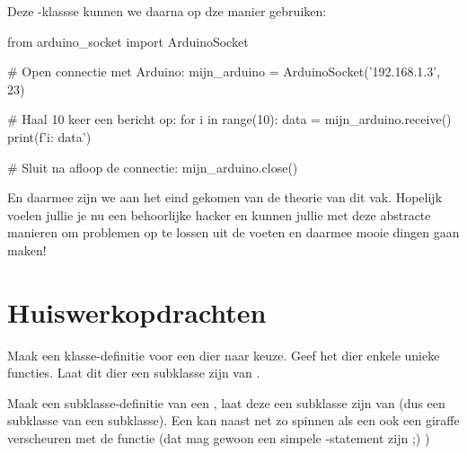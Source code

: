 Deze -klassse kunnen we daarna op dze manier gebruiken:
\begin{python}
from arduino_socket import ArduinoSocket

# Open connectie met Arduino:
mijn_arduino = ArduinoSocket('192.168.1.3', 23)

# Haal 10 keer een bericht op:
for i in range(10):
    data = mijn_arduino.receive()
    print(f'{i}: {data}')

# Sluit na afloop de connectie:
mijn_arduino.close()
\end{python}

En daarmee zijn we aan het eind gekomen van de theorie van dit vak. Hopelijk voelen jullie je nu een behoorlijke hacker en kunnen jullie met deze abstracte manieren om problemen op te lossen uit de voeten en daarmee mooie dingen gaan maken!

%


\newpage

\section{Huiswerkopdrachten}

\begin{exercise}
  Maak een klasse-definitie voor een dier naar keuze. Geef het dier enkele unieke functies. Laat dit dier een subklasse zijn van .
\end{exercise}

\begin{exercise}
  Maak een subklasse-definitie van een , laat deze een subklasse zijn van  (dus een subklasse van een subklasse). Een  kan naast net zo spinnen als een  ook een giraffe verscheuren met de functie  (dat mag gewoon een simpele -statement zijn ;) )
\end{exercise}

